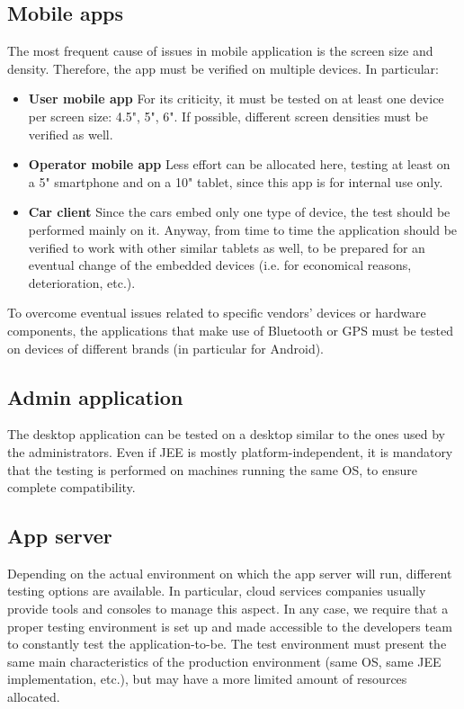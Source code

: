 	\subsection*{Mobile apps}
		The most frequent cause of issues in mobile application is the screen size and density. Therefore, the app must be verified on multiple devices. In particular:
			\begin{itemize}
				\item \textbf{User mobile app} For its criticity, it must be tested on at least one device per screen size: 4.5", 5", 6". If possible, different screen densities must be verified as well.
				\item \textbf{Operator mobile app} Less effort can be allocated here, testing at least on a 5" smartphone and on a 10" tablet, since this app is for internal use only.
				\item \textbf{Car client} Since the cars embed only one type of device, the test should be performed mainly on it. Anyway, from time to time the application should be verified to work with other similar tablets as well, to be prepared for an eventual change of the embedded devices (i.e. for economical reasons, deterioration, etc.).
			\end{itemize}
		To overcome eventual issues related to specific vendors' devices or hardware components, the applications that make use of Bluetooth or GPS must be tested on devices of different brands (in particular for Android).

	\subsection*{Admin application}
		The desktop application can be tested on a desktop similar to the ones used by the administrators. Even if JEE is mostly platform-independent, it is mandatory that the testing is performed on machines running the same OS, to ensure complete compatibility.

	\subsection*{App server}
		Depending on the actual environment on which the app server will run, different testing options are available. In particular, cloud services companies usually provide tools and consoles to manage this aspect.
		In any case, we require that a proper testing environment is set up and made accessible to the developers team to constantly test the application-to-be. The test environment must present the same main characteristics of the production environment (same OS, same JEE implementation, etc.), but may have a more limited amount of resources allocated.
